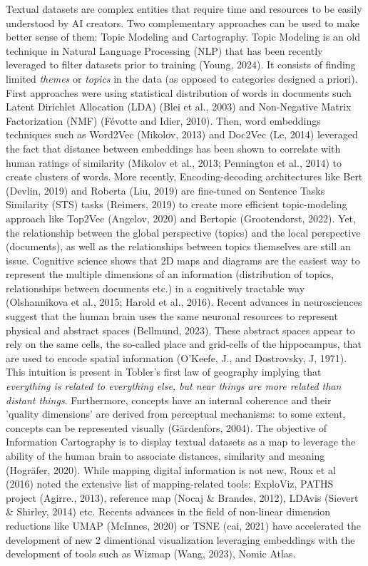 \documentclass{article}
\begin{document}
Textual datasets are complex entities that require time and resources to be easily understood by AI creators. Two complementary approaches can be used to make better sense of them: Topic Modeling and Cartography. Topic Modeling is an old technique in Natural Language Processing (NLP) that has been recently leveraged to filter datasets prior to training (Young, 2024). It consists of finding limited \textit{themes} or \textit{topics} in the data (as opposed to categories designed a priori). First approaches were using statistical distribution of words in documents such Latent Dirichlet Allocation (LDA) (Blei et al., 2003) and Non-Negative Matrix Factorization (NMF) (Févotte and Idier, 2010). Then, word embeddings techniques such as Word2Vec (Mikolov, 2013) and Doc2Vec (Le, 2014) leveraged the fact that distance between embeddings has been shown to correlate with human ratings of similarity (Mikolov et al., 2013; Pennington et al., 2014) to create clusters of words. More recently, Encoding-decoding architectures like Bert (Devlin, 2019) and Roberta (Liu, 2019) are fine-tuned on Sentence Tasks Similarity (STS) tasks (Reimers, 2019) to create more efficient topic-modeling approach like Top2Vec (Angelov, 2020) and Bertopic (Grootendorst, 2022). Yet, the relationship between the global perspective (topics) and the local perspective (documents), as well as the relationships between topics themselves are still an issue. Cognitive science shows that 2D maps and diagrams are the easiest way to represent the multiple dimensions of an information (distribution of topics, relationships between documents etc.) in a cognitively tractable way (Olshannikova et al., 2015; Harold et al., 2016). Recent advances in neurosciences suggest that the human brain uses the same neuronal resources to represent physical and abstract spaces (Bellmund, 2023). These abstract spaces appear to rely on the same cells, the so-called place and grid-cells of the hippocampus, that are used to encode spatial information (O'Keefe, J., and Dostrovsky, J, 1971). This intuition is present in Tobler’s first law of geography implying that \textit{everything is related to everything else, but near things are more related than distant things}. Furthermore, concepts have an internal coherence and their 'quality dimensions' are derived from perceptual mechanisms: to some extent, concepts can be represented visually (Gärdenfors, 2004). The objective of Information Cartography is to display textual datasets as a map to leverage the ability of the human brain to associate distances, similarity and meaning (Hogräfer, 2020). While mapping digital information is not new, Roux et al (2016) noted the extensive list of mapping-related tools: ExploViz, PATHS project (Agirre., 2013), reference map (Nocaj \& Brandes, 2012), LDAvis (Sievert \& Shirley, 2014) etc.  Recents advances in the field of non-linear dimension reductions like UMAP (McInnes, 2020) or TSNE (cai, 2021) have accelerated the development of new 2 dimentional visualization leveraging embeddings with the development of tools such as Wizmap (Wang, 2023), Nomic Atlas.
\end{document}
